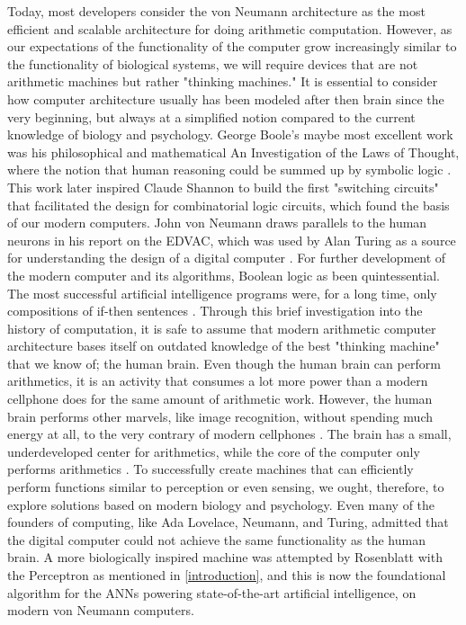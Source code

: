 Today, most developers consider the von Neumann architecture as the most efficient and scalable architecture for doing arithmetic computation.
However, as our expectations of the functionality of the computer grow increasingly similar to the functionality of biological systems, we will require devices that are not arithmetic machines but rather "thinking machines."
It is essential to consider how computer architecture usually has been modeled after then brain since the very beginning, but always at a simplified notion compared to the current knowledge of biology and psychology.
George Boole's maybe most excellent work was his philosophical and mathematical An Investigation of the Laws of Thought, where the notion that human reasoning could be summed up by symbolic logic \cite{boole_investigation_1854}.
This work later inspired Claude Shannon to build the first "switching circuits" that facilitated the design for combinatorial logic circuits, which found the basis of our modern computers.
John von Neumann draws parallels to the human neurons in his report on the EDVAC, which was used by Alan Turing as a source for understanding the design of a digital computer \cite{von_neumann_first_1993}.
For further development of the modern computer and its algorithms, Boolean logic as been quintessential. The most successful artificial intelligence programs were, for a long time, only compositions of if-then sentences \cite{haenlein_brief_2019}.
Through this brief investigation into the history of computation, it is safe to assume that modern arithmetic computer architecture bases itself on outdated knowledge of the best "thinking machine" that we know of; the human brain.
Even though the human brain can perform arithmetics, it is an activity that consumes a lot more power than a modern cellphone does for the same amount of arithmetic work. However, the human brain performs other marvels, like image recognition, without spending much energy at all, to the very contrary of modern cellphones \cite{meier_special_2017}. The brain has a small, underdeveloped center for arithmetics, while the core of the computer only performs arithmetics \cite{dehaene_arithmetic_2004}.
To successfully create machines that can efficiently perform functions similar to perception or even sensing, we ought, therefore, to explore solutions based on modern biology and psychology.
Even many of the founders of computing, like Ada Lovelace, Neumann, and Turing, admitted that the digital computer could not achieve the same functionality as the human brain.
A more biologically inspired machine was attempted by Rosenblatt with the Perceptron as mentioned in \vref{introduction}, and this is now the foundational algorithm for the ANNs powering state-of-the-art artificial intelligence, on modern von Neumann computers.

